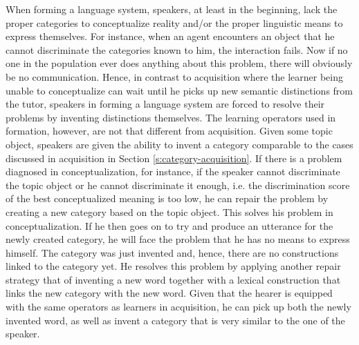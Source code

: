 When forming a language system, speakers, at least in the beginning, lack the proper
categories to conceptualize reality and/or the proper linguistic means to express 
themselves. For instance, when an agent encounters an object that he cannot 
discriminate the categories known to him, the interaction fails. 
Now if no one in the population ever does anything about this problem,
there will obviously be no communication. Hence, in contrast to acquisition where
the learner being unable to conceptualize can wait until he picks up new semantic 
distinctions from the tutor, speakers in forming a language system are forced to resolve
their problems by inventing distinctions themselves. The learning operators used in formation, however,
are not that different from acquisition. Given some topic object, speakers
are given the ability to invent a category comparable to the cases discussed in acquisition 
in Section \ref{s:category-acquisition}. If there is a problem diagnosed in conceptualization, 
for instance, if the speaker cannot discriminate the topic object or 
he cannot discriminate it enough, i.e. the discrimination score of the best 
conceptualized meaning is too low, he can repair the problem
by creating a new category based on the topic object. This solves his problem 
in conceptualization. If he then goes on to try and produce an utterance for the newly created
category, he will face the problem that he has no means to express himself. The category
was just invented and, hence, there are no constructions linked to the category yet. He
resolves this problem by applying another repair strategy that of inventing a
new word together with a lexical construction that links the new category with the new word.
Given that the hearer is equipped with the same operators as learners in acquisition, he can pick
up both the newly invented word, as well as invent a category that is very similar
to the one of the speaker. 

